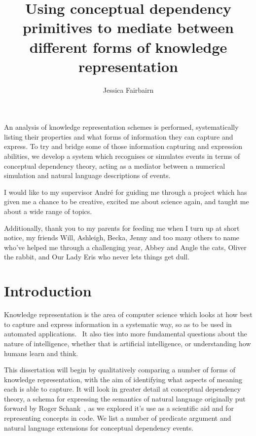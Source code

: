 \documentclass[12pt,MSc,wordcount,twoside]{muthesis}
\begin{document}
    \title{Using conceptual dependency primitives to mediate between different forms of knowledge representation}
    \author{Jessica Fairbairn}
        
    \beforeabstract

    An analysis of knowledge representation schemes is performed, systematically listing their properties and what forms of information they can capture and express. To try and bridge some of those information capturing and expression abilities, we develop a system which recognises or simulates events in terms of conceptual dependency theory, acting as a mediator between a numerical simulation and natural language descriptions of events.
    
    \afterabstract
    
    I would like to my supervisor Andr{\'e} for guiding me through a project which has given me a chance to be creative, excited me about science again, and taught me about a wide range of topics.

    Additionally, thank you to my parents for feeding me when I turn up at short notice, my friends Will, Ashleigh, Becka, Jenny and too many others to name who've helped me through a challenging year, Abbey and Angle the cats, Oliver the rabbit, and Our Lady Eris who never lets things get dull.
    \afterpreface
    
    \chapter{Introduction}
    Knowledge representation is the area of computer science which looks at how best to capture and express information in a systematic way, so as to be used in automated applications.~\cite{brachman1992knowledge} It also ties into more fundamental questions about the nature of intelligence, whether that is artificial intelligence, or understanding how humans learn and think.

    This dissertation will begin by qualitatively comparing a number of forms of knowledge representation, with the aim of identifying what aspects of meaning each is able to capture. It will look in greater detail at conceptual dependency theory, a schema for expressing the semantics of natural language originally put forward by Roger Schank~\cite{SCHANK1972552}, as we explored it's use as a scientific aid and for representing concepts in code. We list a number of predicate argument and natural language extensions for conceptual dependency events.
\end{document}
